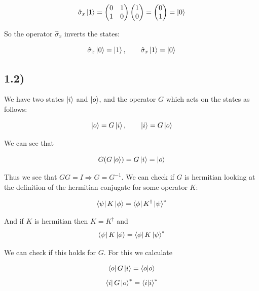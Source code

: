 \documentclass[a4paper,norsk, 10pt]{article}
\begin{document}
\begin{equation}
\hat{\sigma}_x\ket{1} = 
\begin{pmatrix}
0 & 1\\
1 & 0
\end{pmatrix}
\begin{pmatrix}
1 \\ 0
\end{pmatrix} = 
\begin{pmatrix}
0 \\ 1
\end{pmatrix} = \ket{0}
\end{equation}

So the operator $\hat{\sigma}_x$ inverts the states:

\begin{equation}
\hat{\sigma}_x\ket{0} = \ket{1}, \qquad \hat{\sigma}_x\ket{1} = \ket{0}
\end{equation}

\subsection{1.2)}\label{sec:12}

We have two states $\ket{i}$ and $\ket{o}$, and the operator $G$ which acts on the states as follows:

\begin{equation}
\ket{o} = G\ket{i}, \qquad \ket{i} = G\ket{o}
\end{equation}

We can see that 

\begin{equation}
G(G\ket{o}) = G\ket{i} = \ket{o}
\end{equation}

Thus we see that $GG = I \Rightarrow G = G^{-1}$. We can check if $G$ is hermitian looking at the definition of the hermitian conjugate for some operator $K$:

\begin{equation}
\bra{\psi}K\ket{\phi} = \bra{\phi}K^\dagger\ket{\psi}^*
\end{equation}

And if $K$ is hermitian then $K = K^\dagger$ and
\begin{equation}
\bra{\psi}K\ket{\phi} = \bra{\phi}K\ket{\psi}^*
\label{eq:hermitDef}
\end{equation}

We can check if this holds for $G$. For this we calculate

\begin{equation}
\bra{o}G\ket{i} = \braket{o}{o}
\end{equation}
\begin{equation}
\bra{i}G\ket{o}^* = \braket{i}{i}^* 
\end{equation}
\end{document}
